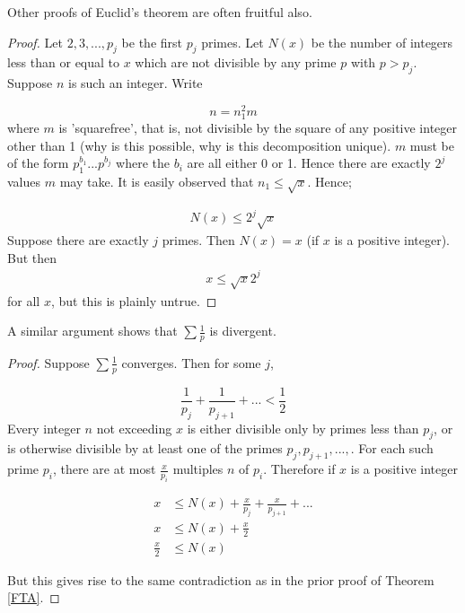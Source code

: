 Other proofs of Euclid's theorem are often fruitful also.

\begin{proof}
    Let $2,3,...,p_j$ be the first $p_j$ primes. Let $N(x)$ be the number of integers less than or equal to $x$ which are not divisible by any prime $p$ with 
    $p > p_j$. Suppose $n$ is such an integer. Write

    \begin{equation*}
        n = n_1^2 m
    \end{equation*}
    where $m$ is 'squarefree', that is, not divisible by the square of any positive integer other than 1 (why is this possible, why is this decomposition unique). 
    $m$ must be of the form $p_1^{b_1} ... p^{b_j}$ where the $b_i$ are all either 0 or 1. Hence there are exactly $2^j$ values $m$ may take. It is easily observed 
    that $n_1 \leq \sqrt{x}$. Hence;

    \begin{align*}
        N(x) \leq 2^j \sqrt{x}
    \end{align*}
    Suppose there are exactly $j$ primes. Then $N(x) = x$ (if $x$ is a positive integer). But then
    \begin{align*}
        x \leq \sqrt{x}2^j
    \end{align*}
    for all $x$, but this is plainly untrue.

\end{proof}

\begin{remark}
    A similar argument shows that $\sum\frac{1}{p}$ is divergent.
\end{remark}

\begin{proof}
    Suppose $\sum \frac{1}{p}$ converges. Then for some $j$,

    \begin{equation*}
        \frac{1}{p_j} + \frac{1}{p_{j+1}} + ... < \frac{1}{2}
    \end{equation*}
    Every integer $n$ not exceeding $x$ is either divisible only by primes less than $p_j$, or is otherwise divisible by at least one of the primes 
    $p_j,p_{j+1},...,$. For each such prime $p_i$, there are at most $\frac{x}{p_i}$ multiples $n$ of $p_i$. Therefore if $x$ is a positive integer 

    \begin{align*}
        x &\leq N(x) + \frac{x}{p_j} + \frac{x}{p_{j+1}} + ... \\
        x &\leq N(x) + \frac{x}{2} \\
        \frac{x}{2} &\leq N(x)
    \end{align*}

    \noi
    But this gives rise to the same contradiction as in the prior proof of Theorem \ref{FTA}.

\end{proof}

